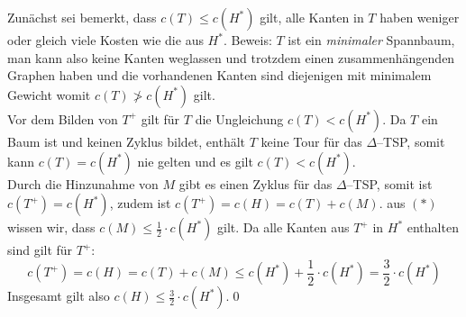 \documentclass[a4paper]{article}
\begin{document}
	\maketitle
	\section{}
		Zunächst sei bemerkt, dass $c(T)\leq c(H^*)$ gilt, alle Kanten in $T$ haben weniger oder gleich viele Kosten wie die aus $H^*$.\n
		Beweis: $T$ ist ein \textit{minimaler} Spannbaum, man kann also keine Kanten weglassen und trotzdem einen zusammenhängenden Graphen haben und die vorhandenen Kanten sind diejenigen mit minimalem Gewicht womit $c(T)\not> c(H^*)$ gilt.\\
		Vor dem Bilden von $T^+$ gilt für $T$ die Ungleichung $c(T)<c(H^*)$.
		Da $T$ ein Baum ist und keinen Zyklus bildet, enthält $T$ keine Tour für das $\Delta$--TSP, somit kann $c(T)=c(H^*)$ nie gelten und es gilt $c(T)<c(H^*)$.\\
		Durch die Hinzunahme von $M$ gibt es einen Zyklus für das $\Delta$--TSP, somit ist $c(T^+)=c(H^*)$, zudem ist $c(T^+)=c(H)=c(T)+c(M)$.
		aus $(*)$ wissen wir, dass $c(M)\leq \frac{1}{2}\cdot c(H^*)$ gilt.
		Da alle Kanten aus $T^+$ in $H^*$ enthalten sind gilt für $T^+$:
		\[c(T^+)=c(H)=c(T)+c(M)\leq c(H^*)+\frac{1}{2}\cdot c(H^*)=\frac{3}{2}\cdot c(H^*)\]
		Insgesamt gilt also $c(H)\leq \frac{3}{2}\cdot c(H^*)$.\qed
\end{document}
